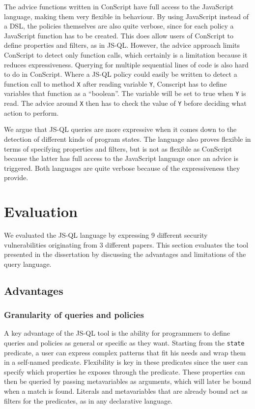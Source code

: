 The advice functions written in ConScript have full access to the JavaScript language, making them very flexible in behaviour. By using JavaScript instead of a DSL, the policies themselves are also quite verbose, since for each policy a JavaScript function has to be created. This does allow users of ConScript to define properties and filters, as in JS-QL. However, the advice approach limits ConScript to detect only function calls, which certainly is a limitation because it reduces expressiveness. Querying for multiple sequential lines of code is also hard to do in ConScript. Where a JS-QL policy could easily be written to detect a function call to method \texttt{X} after reading variable \texttt{Y}, Conscript has to define variables that function as a ``boolean''. The variable will be set to true when \texttt{Y} is read. The advice around \texttt{X} then has to check the value of \texttt{Y} before deciding what action to perform.

We argue that JS-QL queries are more expressive when it comes down to the detection of different kinds of program states. The language also proves flexible in terms of specifying properties and filters, but is not as flexible as ConScript because the latter has full access to the JavaScript language once an advice is triggered. Both languages are quite verbose because of the expressiveness they provide.


\section{Evaluation}
\label{sec:ValidationEvaluation}
We evaluated the JS-QL language by expressing 9 different security vulnerabilities originating from 3 different papers. This section evaluates the tool presented in the dissertation by discussing the advantages and limitations of the query language.

\subsection{Advantages}

\subsubsection*{Granularity of queries and policies}
A key advantage of the JS-QL tool is the ability for programmers to define queries and policies as general or specific as they want. Starting from the \texttt{state} predicate, a user can express complex patterns that fit his needs and wrap them in a self-named predicate. Flexibility is key in these predicates since the user can specify which properties he exposes through the predicate. These properties can then be queried by passing metavariables as arguments, which will later be bound when a match is found. Literals and metavariables that are already bound act as filters for the predicates, as in any declarative language.

